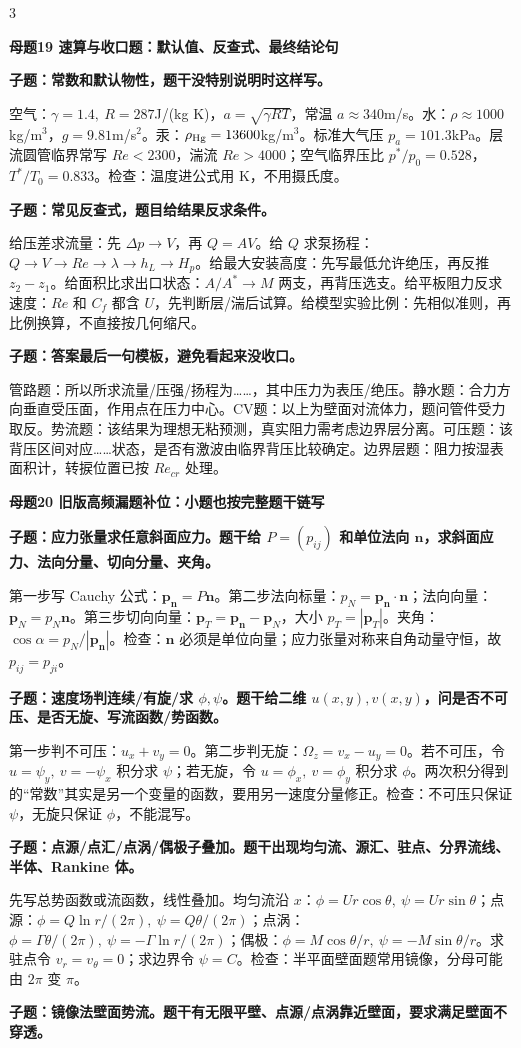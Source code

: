 \documentclass[a4paper]{article}
\newcommand{\mt}[1]{\vspace{0.22pt}\colorbox{M}{\parbox{\dimexpr\linewidth-2\fboxsep}{\color{white}\bfseries #1}}\par}
\newcommand{\qt}[1]{\vspace{0.10pt}\colorbox{Q}{\parbox{\dimexpr\linewidth-2\fboxsep}{\color{white}\bfseries #1}}\par}
\newcommand{\ans}[1]{\colorbox{G}{\parbox{\dimexpr\linewidth-2\fboxsep}{#1}}\par}
\begin{document}
\begin{multicols}{3}
\mt{母题19 速算与收口题：默认值、反查式、最终结论句}
\qt{子题：常数和默认物性，题干没特别说明时这样写。}
\ans{空气：$\gamma=1.4,\ R=287$J/(kg K)，$a=\sqrt{\gamma RT}$，常温 $a\approx340$m/s。水：$\rho\approx1000$kg/m$^3$，$g=9.81$m/s$^2$。汞：$\rho_{\rm Hg}=13600$kg/m$^3$。标准大气压 $p_a=101.3$kPa。层流圆管临界常写 $Re<2300$，湍流 $Re>4000$；空气临界压比 $p^*/p_0=0.528$，$T^*/T_0=0.833$。检查：温度进公式用 K，不用摄氏度。}
\qt{子题：常见反查式，题目给结果反求条件。}
\ans{给压差求流量：先 $\Delta p\to V$，再 $Q=AV$。给 $Q$ 求泵扬程：$Q\to V\to Re\to\lambda\to h_L\to H_p$。给最大安装高度：先写最低允许绝压，再反推 $z_2-z_1$。给面积比求出口状态：$A/A^*\to M$ 两支，再背压选支。给平板阻力反求速度：$Re$ 和 $C_f$ 都含 $U$，先判断层/湍后试算。给模型实验比例：先相似准则，再比例换算，不直接按几何缩尺。}
\qt{子题：答案最后一句模板，避免看起来没收口。}
\ans{管路题：所以所求流量/压强/扬程为……，其中压力为表压/绝压。静水题：合力方向垂直受压面，作用点在压力中心。CV题：以上为壁面对流体力，题问管件受力取反。势流题：该结果为理想无粘预测，真实阻力需考虑边界层分离。可压题：该背压区间对应……状态，是否有激波由临界背压比较确定。边界层题：阻力按湿表面积计，转捩位置已按 $Re_{cr}$ 处理。}
\mt{母题20 旧版高频漏题补位：小题也按完整题干链写}
\qt{子题：应力张量求任意斜面应力。题干给 $P=(p_{ij})$ 和单位法向 $\bm n$，求斜面应力、法向分量、切向分量、夹角。}
\ans{第一步写 Cauchy 公式：$\bm p_{\bm n}=P\bm n$。第二步法向标量：$p_N=\bm p_{\bm n}\cdot\bm n$；法向向量：$\bm p_N=p_N\bm n$。第三步切向向量：$\bm p_T=\bm p_{\bm n}-\bm p_N$，大小 $p_T=|\bm p_T|$。夹角：$\cos\alpha=p_N/|\bm p_{\bm n}|$。检查：$\bm n$ 必须是单位向量；应力张量对称来自角动量守恒，故 $p_{ij}=p_{ji}$。}
\qt{子题：速度场判连续/有旋/求 $\phi,\psi$。题干给二维 $u(x,y),v(x,y)$，问是否不可压、是否无旋、写流函数/势函数。}
\ans{第一步判不可压：$u_x+v_y=0$。第二步判无旋：$\Omega_z=v_x-u_y=0$。若不可压，令 $u=\psi_y,\ v=-\psi_x$ 积分求 $\psi$；若无旋，令 $u=\phi_x,\ v=\phi_y$ 积分求 $\phi$。两次积分得到的“常数”其实是另一个变量的函数，要用另一速度分量修正。检查：不可压只保证 $\psi$，无旋只保证 $\phi$，不能混写。}
\qt{子题：点源/点汇/点涡/偶极子叠加。题干出现均匀流、源汇、驻点、分界流线、半体、Rankine 体。}
\ans{先写总势函数或流函数，线性叠加。均匀流沿 $x$：$\phi=Ur\cos\theta,\ \psi=Ur\sin\theta$；点源：$\phi=Q\ln r/(2\pi),\ \psi=Q\theta/(2\pi)$；点涡：$\phi=\Gamma\theta/(2\pi),\ \psi=-\Gamma\ln r/(2\pi)$；偶极：$\phi=M\cos\theta/r,\ \psi=-M\sin\theta/r$。求驻点令 $v_r=v_\theta=0$；求边界令 $\psi=C$。检查：半平面壁面题常用镜像，分母可能由 $2\pi$ 变 $\pi$。}
\qt{子题：镜像法壁面势流。题干有无限平壁、点源/点涡靠近壁面，要求满足壁面不穿透。}

\end{multicols}
\end{document}
